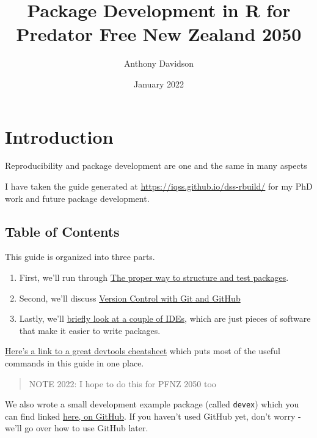 \documentclass[
]{book}
\title{Package Development in R for Predator Free New Zealand 2050}
\author{Anthony Davidson}
\date{January 2022}
\begin{document}
\maketitle

{
\setcounter{tocdepth}{1}
\tableofcontents
}
\hypertarget{introduction}{%
\chapter*{Introduction}\label{introduction}}

Reproducibility and package development are one and the same in many aspects

I have taken the guide generated at \url{https://iqss.github.io/dss-rbuild/} for my PhD work and future package development.

\hypertarget{table-of-contents}{%
\section*{Table of Contents}\label{table-of-contents}}

This guide is organized into three parts.

\begin{enumerate}
\def\labelenumi{\arabic{enumi}.}
\item
  First, we'll run through \href{./package-development.html}{The proper way to structure and test packages}.
\item
  Second, we'll discuss \href{./version-control.html}{Version Control with Git and GitHub}
\item
  Lastly, we'll \href{./integrated-development-environments.html}{briefly look at a couple of IDEs}, which are just pieces of software that make it easier to write packages.
\end{enumerate}

\href{https://www.rstudio.com/wp-content/uploads/2015/03/devtools-cheatsheet.pdf}{Here's a link to a great devtools cheatsheet} which puts most of the useful commands in this guide in one place.

\begin{quote}
NOTE 2022: I hope to do this for PFNZ 2050 too
\end{quote}

We also wrote a small development example package (called \texttt{devex}) which you can find linked \href{https://github.com/IQSS/dss-rbuild/tree/master/devex}{here, on GitHub}. If you haven't used GitHub yet, don't worry - we'll go over how to use GitHub later.
\end{document}

